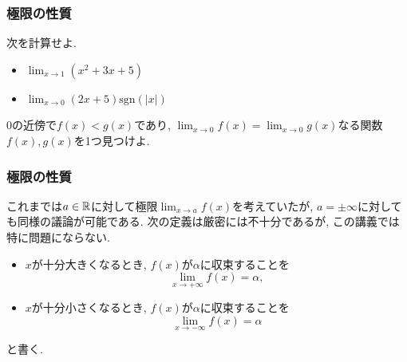 

%
%
%
%





\begin{frame}
\frametitle{極限の性質} 


\begin{Prob}
次を計算せよ. 
\begin{itemize}
\item $\displaystyle \lim_{x\to 1} (x^2+3x+5)$
\item $\displaystyle \lim_{x\to 0} (2x+5)\mathrm{sgn}(|x|)$
\end{itemize}
\end{Prob}

\begin{Prob} 
$0$の近傍で$f(x)< g(x)$であり, $\displaystyle \lim_{x\to 0}f(x) = \lim_{x\to 0}g(x)$なる関数$f(x),g(x)$を1つ見つけよ.
\end{Prob}


\end{frame}






\begin{frame}
\frametitle{極限の性質} 


これまでは$a \in \mathbb{R}$に対して極限$\displaystyle \lim_{x \to a}f(x)$を考えていたが, $a= \pm \infty$に対しても同様の議論が可能である. 
次の定義は厳密には不十分であるが, この講義では特に問題にならない.  

\begin{itemize}
\item $x$が十分大きくなるとき, $f(x)$が$\alpha$に収束することを
$$
\lim_{x\to +\infty} f(x)=\alpha, 
$$
\item $x$が十分小さくなるとき, $f(x)$が$\alpha$に収束することを
$$
\lim_{x\to -\infty} f(x)=\alpha
$$
\end{itemize}
と書く. 

\end{frame}




